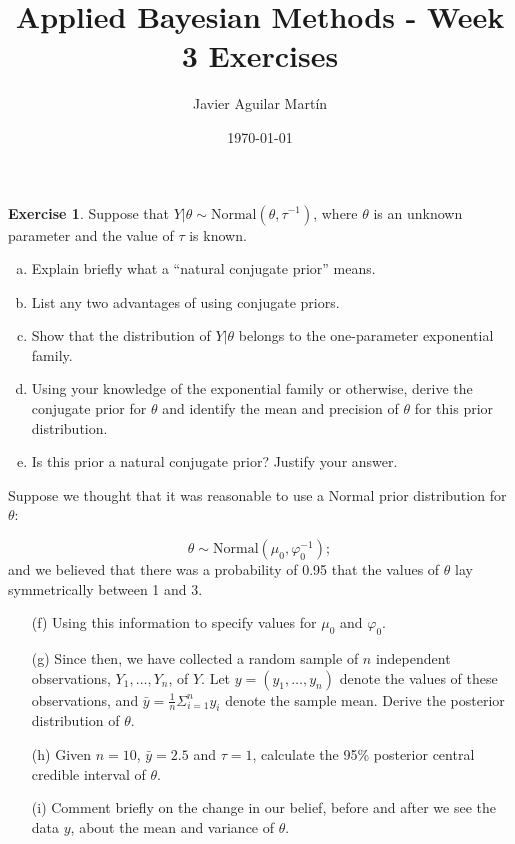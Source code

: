 \documentclass{article}
\theoremstyle{plain}
\theoremstyle{definition}
\newtheorem{exercise}{Exercise}
\begin{document}
\title{Applied Bayesian Methods - Week 3 Exercises}
\author{Javier Aguilar Martín}
\date{\today}
\maketitle
\begin{exercise}
Suppose that
$Y | θ \sim \mathrm{Normal}(θ, τ^{-1})$,
where $θ$ is an unknown parameter and the value of $τ$ is known.
\begin{enumerate}[(a)]
\item Explain briefly what a ``natural conjugate prior'' means.
\item List any two advantages of using conjugate priors.
\item Show that the distribution of $Y | θ$ belongs to the one-parameter
exponential family.
\item Using your knowledge of the exponential family or otherwise, derive
the conjugate prior for $θ$ and identify the mean and precision
of $θ$ for this prior distribution.
\item Is this prior a natural conjugate prior? Justify your answer.

\end{enumerate}
Suppose we thought that it was reasonable to use a Normal prior distribution
for $θ$:

\[θ \sim \mathrm{Normal}(μ_0, φ^{-1}_0 ) ;\]
and we believed that there was a probability of 0.95 that the values of
$θ$ lay symmetrically between 1 and 3.
\begin{enumerate}
\item[(f)] Using this information to specify values for $μ_0$ and $φ_0$.
\item[(g)] Since then, we have collected a random sample of $n$ independent
observations, $Y_1,\dots, Y_n$, of $Y$. Let $y = (y_1, \dots , y_n)$ denote the values of these observations, and $\bar{y} = \frac{1}{n}Σ^n_{i=1} y_i$ denote the sample mean. Derive the posterior distribution of $θ$.
\item[(h)] Given $n = 10$, $\bar{y} = 2.5$ and $τ = 1$, calculate the 95\% posterior central credible interval of $θ$.
\item[(i)] Comment briefly on the change in our belief, before and after we
see the data $y$, about the mean and variance of $θ$.
\end{enumerate}
 

\end{exercise}
\end{document}
